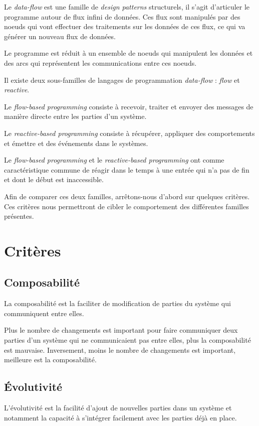 \documentclass{article}
\begin{document}
Le \emph{data-flow} est une famille de \emph{design patterns} structurels,
il s'agit d'articuler le programme autour de flux infini de données.
Ces flux sont manipulés par des noeuds qui vont effectuer des traitements sur
les données de ces flux, ce qui va générer un nouveau flux de données.

Le programme est réduit à un ensemble de noeuds qui
manipulent les données et des arcs qui représentent les
communications entre ces noeuds.

Il existe deux sous-familles de langages de programmation \emph{data-flow} :
\emph{flow} et \emph{reactive}.

Le \emph{flow-based programming} consiste à recevoir, traiter et envoyer des messages de
manière directe entre les parties d'un système.

Le \emph{reactive-based programming} consiste à récupérer, appliquer des comportements
et émettre et des événements dans le systèmes.

Le \emph{flow-based programming} et le \emph{reactive-based programming} ont comme
caractéristique commune de réagir dans le temps à une entrée qui n'a pas de fin et
dont le début est inaccessible.

Afin de comparer ces deux familles, arrêtons-nous d'abord sur quelques critères.
Ces critères nous permettront de cibler le comportement des différentes familles présentes.

\section{Critères}\label{criteres}
\subsection{Composabilité}
La composabilité est la faciliter de modification de parties du système qui
communiquent entre elles.

Plus le nombre de changements est important pour faire communiquer deux parties
d'un système qui ne communicaient pas entre elles, plus la composabilité est mauvaise.
Inversement, moins le nombre de changements est important, meilleure est la composabilité.

\subsection{Évolutivité}
L'évolutivité est la facilité d'ajout de nouvelles parties dans un système et notamment
la capacité à s'intégrer facilement avec les parties déjà en place.
\end{document}
